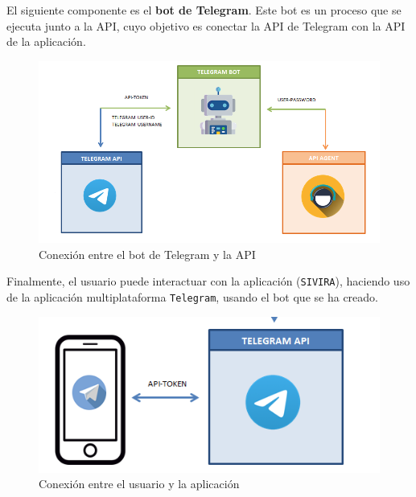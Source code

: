 El siguiente componente es el \textbf{bot de Telegram}. Este bot es un proceso que se ejecuta junto a la API, cuyo objetivo es conectar la API de Telegram con la API de la aplicación.

\begin{figure}[h]
	\centering
	\includegraphics[scale=0.35]{images/34}
	\caption{Conexión entre el bot de Telegram y la API}
	\label{img:conexionbotapitelegram}
\end{figure}

Finalmente, el usuario puede interactuar con la aplicación (\texttt{SIVIRA}), haciendo uso de la aplicación multiplataforma \texttt{Telegram}, usando el bot que se ha creado.

\begin{figure}[h]
	\centering
	\includegraphics[scale=0.35]{images/33}
	\caption{Conexión entre el usuario y la aplicación}
	\label{img:usuariotelegram}
\end{figure}

\newpage
